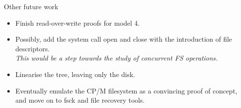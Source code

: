 \documentclass{beamer}
\begin{document}
\begin{frame}{Other future work}
  \begin{itemize}
  \item Finish read-over-write proofs for model 4.
  \item Possibly, add the system call open and close with the
    introduction of file descriptors.\\
    \textit{This would be a step towards the study of concurrent FS operations.}
  \item Linearise the tree, leaving only the disk.
  \item Eventually emulate the CP/M filesystem as a convincing proof
    of concept, and move on to fsck and file recovery tools.
  \end{itemize}
\end{frame}
\end{document}
